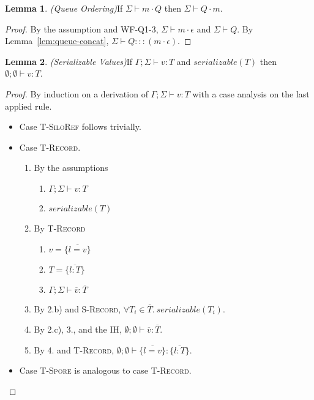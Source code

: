 \documentclass{article}
\theoremstyle{definition}
\newtheorem{lem}{Lemma}[section]
\newcommand{\seq}[1]{\overline{#1}}
\begin{document}
\begin{lem}
\emph{(Queue Ordering)}\label{lem:queue-ordering}
If $\Sigma \vdash m \cdot Q$ then $\Sigma \vdash Q \cdot m$.
\end{lem}
\begin{proof}
By the assumption and WF-Q1-3, $\Sigma \vdash m \cdot \epsilon$ and $\Sigma \vdash Q$. By Lemma~\ref{lem:queue-concat}, $\Sigma \vdash Q ::: (m \cdot \epsilon)$.
\end{proof}

\begin{lem}
\emph{(Serializable Values)}\label{lem:ser-values}
If $\Gamma ; \Sigma \vdash v : T$ and $serializable(T)$ then $\emptyset ; \emptyset \vdash v : T$.
\end{lem}
\begin{proof}
By induction on a derivation of $\Gamma ; \Sigma \vdash v : T$ with a case analysis on the last applied rule.

\begin{itemize}
\item Case \textsc{T-SiloRef} follows trivially.

\item Case \textsc{T-Record}.
\begin{enumerate}
\item By the assumptions
  \begin{enumerate}[label=(\alph*)]
  \item $\Gamma ; \Sigma \vdash v : T$
  \item $serializable(T)$
  \end{enumerate}
\item By \textsc{T-Record}
  \begin{enumerate}[label=(\alph*)]
  \item $v = \{\seq{l = v}\}$
  \item $T = \{\seq{l : T}\}$
  \item $\Gamma ; \Sigma \vdash \seq{v} : \seq{T}$
  \end{enumerate}
\item By 2.b) and \textsc{S-Record}, $\forall T_i \in \seq{T}.~serializable(T_i)$.
\item By 2.c), 3., and the IH, $\emptyset ; \emptyset \vdash \seq{v} : \seq{T}$.
\item By 4. and \textsc{T-Record}, $\emptyset ; \emptyset \vdash \{\seq{l = v}\} : \{\seq{l : T}\}$.
\end{enumerate}

\item Case \textsc{T-Spore} is analogous to case \textsc{T-Record}.
\end{itemize}
\end{proof}
\end{document}
